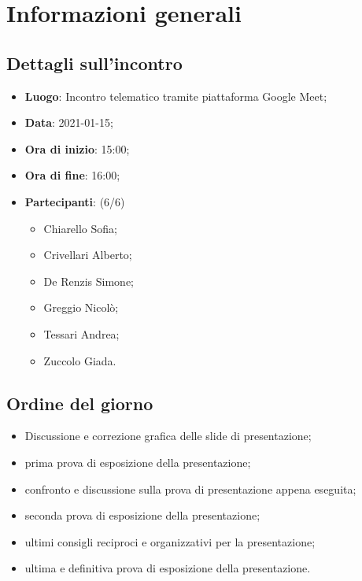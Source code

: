 \section{Informazioni generali}

\subsection{Dettagli sull'incontro}
\begin{itemize}
\item \textbf{Luogo}: Incontro telematico tramite piattaforma Google Meet;
\item \textbf{Data}: 2021-01-15;
\item \textbf{Ora di inizio}: 15:00;
\item \textbf{Ora di fine}: 16:00;
\item \textbf{Partecipanti}: (6/6) 
\begin{itemize}
	\item Chiarello Sofia;
	\item Crivellari Alberto;
	\item De Renzis Simone;
	\item Greggio Nicolò;
	\item Tessari Andrea;
	\item Zuccolo Giada.
\end{itemize}
\end{itemize}

\subsection{Ordine del giorno}
\begin{itemize}
	\item Discussione e correzione grafica delle slide di presentazione;
	\item prima prova di esposizione della presentazione;
	\item confronto e discussione sulla prova di presentazione appena eseguita;
	\item seconda prova di esposizione della presentazione;
	\item ultimi consigli reciproci e organizzativi per la presentazione;
	\item ultima e definitiva prova di esposizione della presentazione.
\end{itemize}